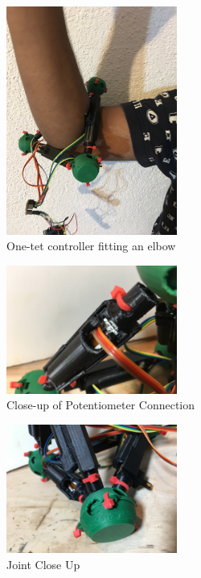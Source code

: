 \documentclass[11pt]{article}
\begin{document}
\begin{figure}[H]
  \centering
    \includegraphics[width=0.5\textwidth]{figures/ElbowFitting.JPG}
    \caption[One-tet controller fitting an elbow]{One-tet controller fitting an elbow}
      \label{fig:elbowfitting}
\end{figure}

\begin{figure}[H]
  \centering
    \includegraphics[width=0.5\textwidth]{figures/PotConnectionCloseUp.JPG}
    \caption[Close-up of Potentiometer Connection]{Close-up of Potentiometer Connection}
      \label{fig:potcloseup}
\end{figure}

\begin{figure}[H]
  \centering
    \includegraphics[width=0.5\textwidth]{figures/JointCloseUp.JPG}
    \caption[Joint Close Up]{Joint Close Up}
      \label{fig:jointcloseup}
\end{figure}
\end{document}

